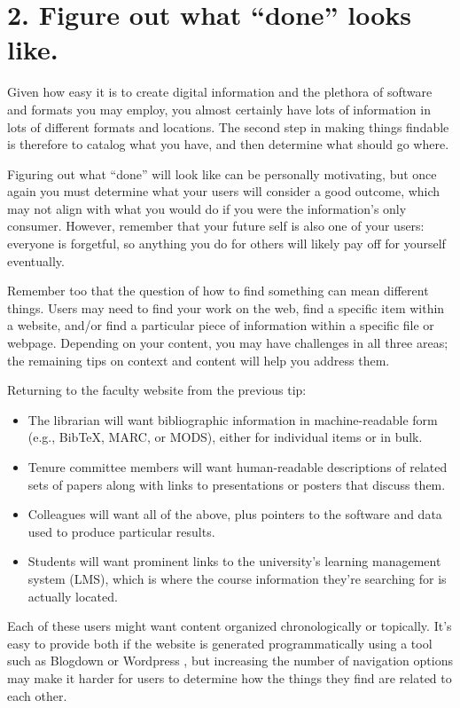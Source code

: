 \documentclass[10pt,letterpaper]{article}
\newcommand{\rulemajor}[1]{\section*{#1}}
\begin{document}
\rulemajor{2. Figure out what ``done'' looks like.}

Given how easy it is to create digital information and the plethora of software
and formats you may employ, you almost certainly have lots of information in
lots of different formats and locations. The second step in making things
findable is therefore to catalog what you have, and then determine what should
go where.

Figuring out what ``done'' will look like can be personally motivating, but once
again you must determine what your users will consider a good outcome, which may
not align with what you would do if you were the information's only consumer.
However, remember that your future self is also one of your users: everyone is
forgetful, so anything you do for others will likely pay off for yourself
eventually.

Remember too that the question of how to find something can mean different
things. Users may need to find your work on the web, find a specific item within
a website, and/or find a particular piece of information within a specific file
or webpage. Depending on your content, you may have challenges in all three
areas; the remaining tips on context and content will help you address them.

Returning to the faculty website from the previous tip:

\begin{itemize}

\item
  The librarian will want bibliographic information in machine-readable form
  (e.g., BibTeX, MARC, or MODS), either for individual items or in bulk.

\item
  Tenure committee members will want human-readable descriptions of related sets
  of papers along with links to presentations or posters that discuss them.

\item
  Colleagues will want all of the above, plus pointers to the software and data
  used to produce particular results.

\item
  Students will want prominent links to the university's learning management
  system (LMS), which is where the course information they're searching for is
  actually located.

\end{itemize}

\noindent
Each of these users might want content organized chronologically or topically.
It's easy to provide both if the website is generated programmatically using a
tool such as Blogdown \cite{Xie2017} or Wordpress \cite{Williams2015}, but
increasing the number of navigation options may make it harder for users to
determine how the things they find are related to each other.
\end{document}
